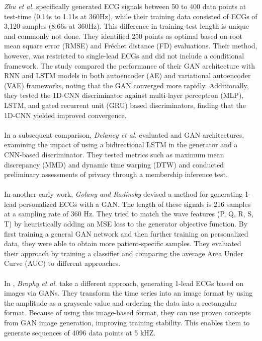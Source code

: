 \textit{Zhu et al.} specifically generated ECG signals between 50 to 400 data points at test-time (0.14s to 1.11s at 360Hz), while their training data consisted of ECGs of 3,120 samples (8.66s at 360Hz). This difference in training-test length is unique and commonly not done. They identified 250 points as optimal based on root mean square error (RMSE) and Fréchet distance (FD) evaluations. Their method, however, was restricted to single-lead ECGs and did not include a conditional framework. The study compared the performance of their GAN architecture with RNN and LSTM models in both autoencoder (AE) and variational autoencoder (VAE) frameworks, noting that the GAN converged more rapidly. Additionally, they tested the 1D-CNN discriminator against multi-layer perceptron (MLP), LSTM, and gated recurrent unit (GRU) based discriminators, finding that the 1D-CNN yielded improved convergence.
\\ \\
In a subsequent comparison, \textit{Delaney et al.} \cite{delaneySynthesisRealisticECG2019} evaluated \cite{estebanRealvaluedMedicalTime2017} and \cite{zhuElectrocardiogramGenerationBidirectional2019} GAN architectures, examining the impact of using a bidirectional LSTM in the generator and a CNN-based discriminator. They tested metrics such as maximum mean discrepancy (MMD) and dynamic time warping (DTW) and conducted preliminary assessments of privacy through a membership inference test.
\\ \\
In another early work, \textit{Golany and Radinsky} \cite{golanyPGANsPersonalizedGenerative2019} devised a method for generating 1-lead personalized ECGs with a GAN. The length of these signals is 216 samples at a sampling rate of 360 Hz. They tried to match the wave features (P, Q, R, S, T) by heuristically adding an MSE loss to the generator objective function. By first training a general GAN network and then further training on personalized data, they were able to obtain more patient-specific samples. They evaluated their approach by training a classifier and comparing the average Area Under Curve (AUC) to different approaches. 
\\ \\ 
In \cite{brophyQuickEasyTime2019}, \textit{Brophy et al.} take a different approach, generating 1-lead ECGs based on images via GANs. They transform the time series into an image format by using the amplitude as a grayscale value and ordering the data into a rectangular format. Because of using this image-based format, they can use proven concepts from GAN image generation, improving training stability. This enables them to generate sequences of 4096 data points at 5 kHZ.
